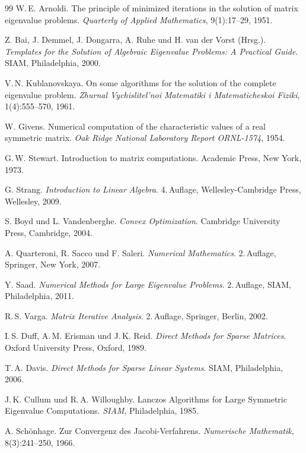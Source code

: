 \documentclass[a4paper,12pt]{article}
\theoremstyle{definition}
\begin{document}
\begin{thebibliography}{99}
W.\,E. Arnoldi. The principle of minimized iterations in the solution of matrix eigenvalue problems. \textit{Quarterly of Applied Mathematics}, 9(1):17--29, 1951.

Z. Bai, J. Demmel, J. Dongarra, A. Ruhe und H. van der Vorst (Hrsg.). \textit{Templates for the Solution of Algebraic Eigenvalue Problems: A Practical Guide}. SIAM, Philadelphia, 2000.

V.\,N. Kublanovskaya. On some algorithms for the solution of the complete eigenvalue problem. \textit{Zhurnal Vychislitel'noi Matematiki i Matematicheskoi Fiziki}, 1(4):555--570, 1961.

W. Givens. Numerical computation of the characteristic values of a real symmetric matrix. \textit{Oak Ridge National Laboratory Report ORNL-1574}, 1954.

G.\,W. Stewart. Introduction to matrix computations. Academic Press, New York, 1973.

G. Strang. \textit{Introduction to Linear Algebra}. 4.\,Auflage, Wellesley-Cambridge Press, Wellesley, 2009.

S. Boyd und L. Vandenberghe. \textit{Convex Optimization}. Cambridge University Press, Cambridge, 2004.

A. Quarteroni, R. Sacco und F. Saleri. \textit{Numerical Mathematics}. 2.\,Auflage, Springer, New York, 2007.

Y. Saad. \textit{Numerical Methods for Large Eigenvalue Problems}. 2.\,Auflage, SIAM, Philadelphia, 2011.

R.\,S. Varga. \textit{Matrix Iterative Analysis}. 2.\,Auflage, Springer, Berlin, 2002.

I.\,S. Duff, A.\,M. Erisman und J.\,K. Reid. \textit{Direct Methods for Sparse Matrices}. Oxford University Press, Oxford, 1989.

T.\,A. Davis. \textit{Direct Methods for Sparse Linear Systems}. SIAM, Philadelphia, 2006.

J.\,K. Cullum und R.\,A. Willoughby. Lanczos Algorithms for Large Symmetric Eigenvalue Computations. \textit{SIAM}, Philadelphia, 1985.

A. Schönhage. Zur Convergenz des Jacobi-Verfahrens. \textit{Numerische Mathematik}, 8(3):241--250, 1966.


\end{thebibliography}
\end{document}
